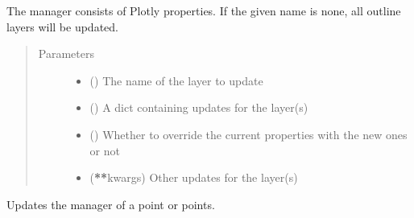 \documentclass[letterpaper,10pt,english]{sphinxmanual}
\begin{document}
\begin{fulllineitems}
\begin{fulllineitems}
\sphinxAtStartPar
The manager consists of Plotly properties.
If the given name is none, all outline layers will be updated.
\begin{quote}\begin{description}
\item[{Parameters}] \leavevmode\begin{itemize}
\item {} 
\sphinxAtStartPar
{} () \textendash{} The name of the layer to update

\item {} 
\sphinxAtStartPar
{} () \textendash{} A dict containing updates for the layer(s)

\item {} 
\sphinxAtStartPar
{} () \textendash{} Whether to override the current properties with the new ones or not

\item {} 
\sphinxAtStartPar
{} ({\color{red}\bfseries{}**}kwargs) \textendash{} Other updates for the layer(s)

\end{itemize}

\end{description}\end{quote}

\end{fulllineitems}


\begin{fulllineitems}
\label{\detokenize{builder:geohexviz.builder.PlotBuilder.update_point_manager}}
\sphinxAtStartPar
Updates the manager of a point or points.


\end{fulllineitems}
\end{fulllineitems}
\end{document}
